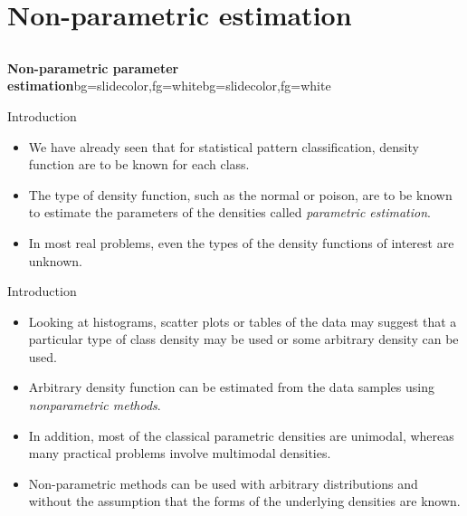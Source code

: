 \section{Non-parametric estimation}
\subsection{}

\begin{frame}{}
\begin{variableblock}{\centering \Large \textbf{\vspace{4pt}\newline Non-parametric parameter estimation\vspace{4pt}}}{bg=slidecolor,fg=white}{bg=slidecolor,fg=white}
\end{variableblock}
\end{frame}

\begin{frame}{Introduction}
\begin{itemize}
\setlength{\itemsep}{12pt}
\item We have already seen that for statistical pattern classification, density function are to be known for each class.
\item The type of density function, such as the normal or poison, are to be known to estimate the parameters of the densities called \textit{\color{mycolor1}parametric estimation}.
\item In most real problems, even the types of the density functions of interest are unknown.
\end{itemize}
\end{frame}

\begin{frame}{Introduction}
\begin{itemize}
\setlength{\itemsep}{8pt}
\item Looking at histograms, scatter plots or tables of the data may suggest that a particular type of class density may be used or some arbitrary density can be used.
\item Arbitrary density function can be estimated from the data samples using \textit{\color{mycolor1}nonparametric methods}.
\item  In addition, most of the classical parametric densities are
unimodal, whereas many practical problems involve multimodal densities.
\item Non-parametric methods can be used with arbitrary
distributions and without the assumption that the forms of
the underlying densities are known.
\end{itemize}
\end{frame}

